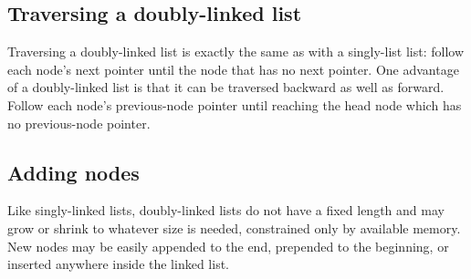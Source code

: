 \documentclass{article}
\begin{document}
%


  \subsection{Traversing a doubly-linked list}
  Traversing a doubly-linked list is exactly the same as with a singly-list list: follow each node's next pointer until the node that has no next pointer. One advantage of a doubly-linked list is that it can be traversed backward as well as forward. Follow each node's previous-node pointer until reaching the head node which has no previous-node pointer.
  \subsection{Adding nodes}
  Like singly-linked lists, doubly-linked lists do not have a fixed length and may grow or shrink to whatever size is needed, constrained only by available memory. New nodes may be easily appended to the end, prepended to the beginning, or inserted anywhere inside the linked list.
\end{document}
